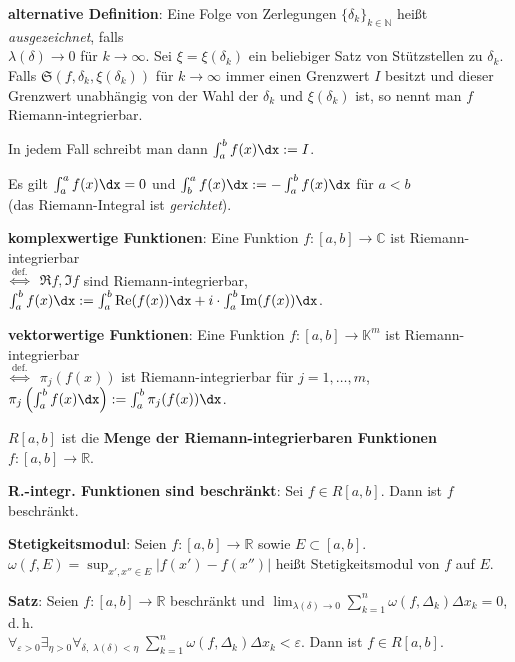 \textbf{alternative Definition}:
Eine Folge von Zerlegungen $\{\delta_k\}_{k \in \mathbb{N}}$ heißt
\emph{ausgezeichnet}, falls \\
$\lambda(\delta) \to 0$ für $k \to \infty$.
Sei $\xi = \xi(\delta_k)$ ein beliebiger Satz von Stützstellen zu
$\delta_k$. \\
Falls $\mathfrak{S}(f, \delta_k, \xi(\delta_k))$ für $k \to \infty$
immer einen Grenzwert $I$ besitzt und dieser Grenzwert unabhängig von der Wahl
der $\delta_k$ und $\xi(\delta_k)$ ist, so nennt man $f$ Riemann-integrierbar.

In jedem Fall schreibt man dann $\int_a^b f(x)\dx := I$.

Es gilt $\int_a^a f(x)\dx = 0$
\quad und \quad $\int_b^a f(x)\dx := -\int_a^b f(x)\dx$ für $a < b$ \\
(das Riemann-Integral ist \emph{gerichtet}).

\textbf{komplexwertige Funktionen}:
Eine Funktion $f: [a,b] \rightarrow \mathbb{C}$ ist Riemann-integrierbar \\
$\overset{\text{def.}}{\Leftrightarrow}\;$ $\Re f, \Im f$ sind
Riemann-integrierbar, \quad
$\int_a^b f(x)\dx := \int_a^b \Re(f(x))\dx + i \cdot \int_a^b \Im(f(x))\dx$.

\textbf{vektorwertige Funktionen}:
Eine Funktion $f: [a,b] \rightarrow \mathbb{K}^m$ ist Riemann-integrierbar \\
$\overset{\text{def.}}{\Leftrightarrow}\;$ $\pi_j(f(x))$ ist
Riemann-integrierbar für $j = 1, \ldots, m$, \quad
$\pi_j\left(\int_a^b f(x)\dx\right) := \int_a^b \pi_j(f(x))\dx$.

$R[a,b]$ ist die \textbf{Menge der Riemann-integrierbaren Funktionen}
$f: [a,b] \rightarrow \mathbb{R}$.

\textbf{R.-integr. Funktionen sind beschränkt}:
Sei $f \in R[a,b]$. \qquad
Dann ist $f$ beschränkt.

\linie

\textbf{Stetigkeitsmodul}:
Seien $f: [a,b] \rightarrow \mathbb{R}$ sowie $E \subset [a,b]$. \\
$\omega(f, E) = \sup_{x', x'' \in E} |f(x') - f(x'')|$
heißt Stetigkeitsmodul von $f$ auf $E$.

\textbf{Satz}:
Seien $f: [a,b] \rightarrow \mathbb{R}$ beschränkt und
$\lim_{\lambda(\delta) \to 0} \sum_{k=1}^n \omega(f, \Delta_k) \Delta x_k = 0$,
d.\,h. \\
$\forall_{\varepsilon > 0} \exists_{\eta > 0}
\forall_{\delta,\; \lambda(\delta) < \eta}\;
\sum_{k=1}^n \omega(f, \Delta_k) \Delta x_k < \varepsilon$. \qquad
Dann ist $f \in R[a,b]$.

